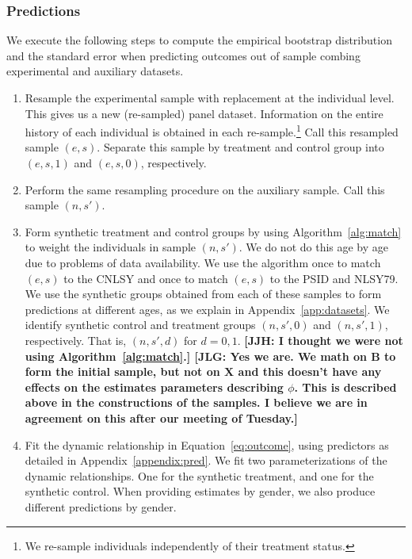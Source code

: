 \subsubsection{Predictions} \label{appendix:bootstrapspreds}

\noindent We execute the following steps to compute the empirical bootstrap distribution and the standard error when predicting outcomes out of sample combing experimental and auxiliary datasets.

\begin{enumerate}
\item Resample the experimental sample with replacement at the individual level. This gives us a new (re-sampled) panel dataset. Information on the entire history of each individual is obtained in each re-sample.\footnote{We re-sample individuals independently of their treatment status.} Call this resampled sample $(e,s)$. Separate this sample by treatment and control group into $(e,s,1)$ and $(e,s,0)$, respectively.

\item Perform the same resampling procedure on the auxiliary sample. Call this sample $(n,s')$.

\item Form synthetic treatment and control groups by using Algorithm~\ref{alg:match} to weight the individuals in sample $(n,s')$. We do not do this age by age due to problems of data availability. We use the algorithm once to match $(e,s)$ to the CNLSY and once to match $(e,s)$ to the PSID and NLSY79. We use the synthetic groups obtained from each of these samples to form predictions at different ages, as we explain in Appendix~\ref{app:datasets}. We identify synthetic control and treatment groups $(n,s',0)$ and $(n,s',1)$, respectively. That is, $(n,s',d)$ for $d = {0,1}$. \textbf{[JJH: I thought we were not using Algorithm~\ref{alg:match}.] [JLG: Yes we are. We math on $\bm{B}$ to form the initial sample, but not on $\bm{X}$ and this doesn't have any effects on the estimates parameters describing $\phi$. This is described above in the constructions of the samples. I believe we are in agreement on this after our meeting of Tuesday.]}

\item Fit the dynamic relationship in Equation~\eqref{eq:outcome}, using predictors as detailed in Appendix~\ref{appendix:pred}. We fit two parameterizations of the dynamic relationships. One for the synthetic treatment, and one for the synthetic control. When providing estimates by gender, we also produce different predictions by gender.


\end{enumerate}
